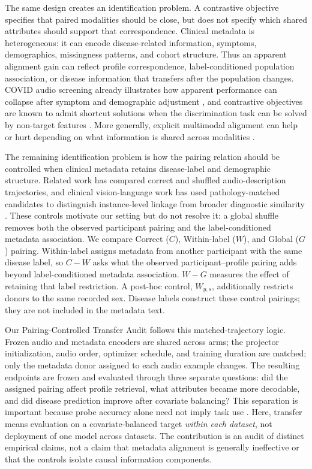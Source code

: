\documentclass{article}
\newcommand{\wys}{\ensuremath{W_{y,s}}}
\begin{document}
The same design creates an identification problem. A contrastive objective
specifies that paired modalities should be close, but does not specify which
shared attributes should support that correspondence. Clinical metadata is
heterogeneous: it can encode disease-related information, symptoms,
demographics, missingness patterns, and cohort structure. Thus an apparent
alignment gain can reflect profile correspondence, label-conditioned population
association, or disease information that transfers after the population changes.
COVID audio screening already illustrates how apparent performance can collapse
after symptom and demographic adjustment
\cite{coppock2024audio}, and contrastive objectives are known to admit shortcut
solutions when the discrimination task can be solved by non-target features
\cite{robinson2021shortcut}. More generally, explicit multimodal alignment can
help or hurt depending on what information is shared across modalities
\cite{fang2026align}.

The remaining identification problem is how the pairing relation should be
controlled when clinical metadata retains disease-label and demographic
structure. Related work has compared correct and shuffled audio-description
trajectories, and clinical vision-language work has used pathology-matched
candidates to distinguish instance-level linkage from broader diagnostic
similarity \cite{min2026semantic,arasteh2026linkage}. These controls motivate
our setting but do not resolve it: a global shuffle removes both the observed
participant pairing and the label-conditioned metadata association. We compare
Correct ($C$), Within-label ($W$), and Global ($G$) pairing. Within-label assigns
metadata from another participant with the same disease label, so $C-W$ asks
what the observed participant--profile pairing adds beyond label-conditioned
metadata association. $W-G$ measures the effect of retaining that label
restriction. A post-hoc control, \wys{}, additionally restricts donors to the
same recorded sex. Disease labels construct these control pairings; they are not
included in the metadata text.

Our Pairing-Controlled Transfer Audit follows this matched-trajectory logic.
Frozen audio and metadata encoders are shared across arms; the projector
initialization, audio order, optimizer schedule, and training duration are
matched; only the metadata donor assigned to each audio example changes. The
resulting endpoints are frozen and evaluated through three separate questions:
did the assigned pairing affect profile retrieval, what attributes became more
decodable, and did disease prediction improve after covariate balancing? This
separation is important because probe accuracy alone need not imply task use
\cite{ravichander2021probing}. Here, transfer means evaluation on a
covariate-balanced target \emph{within each dataset}, not deployment of one
model across datasets. The contribution is an audit of distinct empirical
claims, not a claim that metadata alignment is generally ineffective or that
the controls isolate causal information components.
\end{document}
